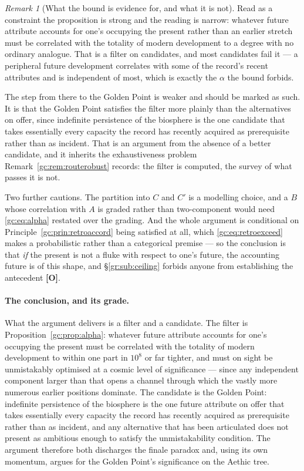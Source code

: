 \documentclass[11pt]{article}
\numberwithin{equation}{section}
\theoremstyle{plain}
\theoremstyle{definition}
\theoremstyle{remark}
\newtheorem{remark}[theorem]{Remark}
\begin{document}
\begin{remark}[What the bound is evidence for, and what it is not]
\label{gc:rem:alphareading}
Read as a constraint the proposition is strong and the reading is
narrow: whatever future attribute accounts for one's occupying the
present rather than an earlier stretch must be correlated with the
totality of modern development to a degree with no ordinary analogue.
That is a filter on candidates, and most candidates fail it --- a
peripheral future development correlates with some of the record's
recent attributes and is independent of most, which is exactly the
$\alpha$ the bound forbids.

The step from there to the Golden Point is weaker and should be marked
as such. It is that the Golden Point satisfies the filter more plainly
than the alternatives on offer, since indefinite persistence of the
biosphere is the one candidate that takes essentially every capacity the
record has recently acquired as prerequisite rather than as incident.
That is an argument from the absence of a better candidate, and it
inherits the exhaustiveness problem Remark~\ref{gc:rem:routerobust} records:
the filter is computed, the survey of what passes it is not.

Two further cautions. The partition into $C$ and $C'$ is a modelling
choice, and a $B$ whose correlation with $A$ is graded rather than
two-component would need \eqref{gc:eq:alpha} restated over the grading.
And the whole argument is conditional on
Principle~\ref{gc:prin:retroaccord} being satisfied at all, which
\eqref{gc:eq:retroexceed} makes a probabilistic rather than a categorical
premise --- so the conclusion is that \emph{if} the present is not a
fluke with respect to one's future, the accounting future is of this
shape, and \S\ref{gr:sub:ceiling} forbids anyone from establishing the
antecedent \textbf{[O]}.
\end{remark}



\paragraph{The conclusion, and its grade.} What the argument delivers is
a filter and a candidate. The filter is
Proposition~\ref{gc:prop:alpha}: whatever future attribute accounts for
one's occupying the present must be correlated with the totality of
modern development to within one part in $10^{8}$ or far tighter, and
must on sight be unmistakably optimised at a cosmic level of
significance --- since any independent component larger than that opens
a channel through which the vastly more numerous earlier positions
dominate. The candidate is the Golden Point: indefinite persistence of
the biosphere is the one future attribute on offer that takes
essentially every capacity the record has recently acquired as
prerequisite rather than as incident, and any alternative that has been
articulated does not present as ambitious enough to satisfy the
unmistakability condition. The argument therefore both discharges the
finale paradox and, using its own momentum, argues for the Golden
Point's significance on the Aethic tree.
\end{document}
